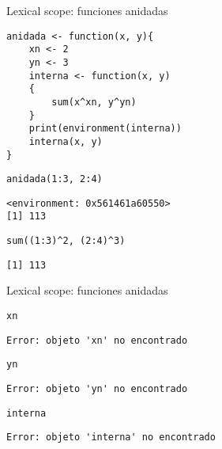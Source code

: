 \documentclass[xcolor={usenames,svgnames,dvipsnames}]{beamer}
\begin{document}
\begin{frame}[label={sec:org826acc0},fragile]{Lexical scope: funciones anidadas}
 \lstset{language=r,label= ,caption= ,captionpos=b,numbers=none}
\begin{lstlisting}
anidada <- function(x, y){
    xn <- 2
    yn <- 3
    interna <- function(x, y)
    {
        sum(x^xn, y^yn)
    }
    print(environment(interna))
    interna(x, y)
}
\end{lstlisting}

\lstset{language=r,label= ,caption= ,captionpos=b,numbers=none}
\begin{lstlisting}
anidada(1:3, 2:4)
\end{lstlisting}

\begin{verbatim}
<environment: 0x561461a60550>
[1] 113
\end{verbatim}


\lstset{language=r,label= ,caption= ,captionpos=b,numbers=none}
\begin{lstlisting}
sum((1:3)^2, (2:4)^3)
\end{lstlisting}

\begin{verbatim}
[1] 113
\end{verbatim}
\end{frame}

\begin{frame}[label={sec:orgd230cb0},fragile]{Lexical scope: funciones anidadas}
 \lstset{language=r,label= ,caption= ,captionpos=b,numbers=none}
\begin{lstlisting}
xn
\end{lstlisting}

\begin{verbatim}
Error: objeto 'xn' no encontrado
\end{verbatim}


\lstset{language=r,label= ,caption= ,captionpos=b,numbers=none}
\begin{lstlisting}
yn
\end{lstlisting}

\begin{verbatim}
Error: objeto 'yn' no encontrado
\end{verbatim}


\lstset{language=r,label= ,caption= ,captionpos=b,numbers=none}
\begin{lstlisting}
interna
\end{lstlisting}

\begin{verbatim}
Error: objeto 'interna' no encontrado
\end{verbatim}
\end{frame}
\end{document}
